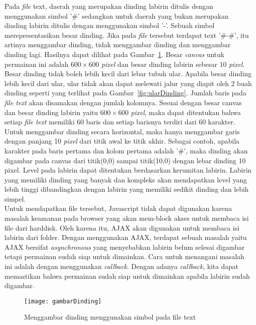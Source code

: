 Pada \textit{file} text, daerah yang merupakan dinding labirin ditulis dengan menggunakan simbol '\#' sedangkan untuk daerah yang bukan merupakan dinding labirin ditulis dengan menggunakan simbol '-'. Sebuah simbol merepresentasikan besar dinding. Jika pada \textit{file} tersebut terdapat text '\#-\#', itu artinya menggambar dinding, tidak menggambar dinding dan menggambar dinding lagi. Hasilnya dapat dilihat pada Gambar~\ref{fig:gambarDinding}. Besar \textit{canvas} untuk permainan ini adalah $600 \times 600$ \textit{pixel} dan besar dinding labirin sebesar 10 \textit{pixel}. Besar dinding tidak boleh lebih kecil dari lebar tubuh ular. Apabila besar dinding lebih kecil dari ular, ular tidak akan dapat melewati jalur yang diapit oleh 2 buah dinding seperti yang terlihat pada Gambar~\ref{fig:ularDinding}. Jumlah baris pada \textit{file text} akan disamakan dengan jumlah kolomnya. Sesuai dengan besar canvas dan besar dinding labirin yaitu $600 \times 600$ \textit{pixel}, maka dapat ditentukan bahwa setiap \textit{file text} memiliki 60 baris dan setiap barisnya terdiri dari 60 karakter. Untuk menggambar dinding secara horizontal, maka hanya menggambar garis dengan panjang 10 \textit{pixel} dari titik awal ke titik akhir. Sebagai contoh, apabila karakter pada baris pertama dan kolom pertama adalah '\#', maka dinding akan digambar pada canvas dari titik(0,0) sampai titik(10,0) dengan lebar dinding 10 pixel. Level pada labirin dapat ditentukan berdasarkan kerumitan labirin. Labirin yang memiliki dinding yang banyak dan kompleks akan mendapatkan level yang lebih tinggi dibandingkan dengan labirin yang memiliki sedikit dinding dan lebih simpel. \\

Untuk mendapatkan file tersebut, Javascript tidak dapat digunakan karena masalah keamanan pada browser yang akan mem-block akses untuk membaca isi file dari harddisk. Oleh karena itu, AJAX akan digunakan untuk membaca isi labirin dari folder. Dengan menggunakan AJAX, terdapat sebuah masalah yaitu AJAX bersifat \textit{asynchronous} yang menyebabkan labirin belum selesai digambar tetapi permainan sudah siap untuk dimainkan. Cara untuk menangani masalah ini adalah dengan menggunakan \textit{callback}. Dengan adanya \textit{callback}, kita dapat memastikan bahwa permainan sudah siap untuk dimainkan apabila labirin sudah digambar.\\ 


\begin{figure}[H]
	\centering  
	\texttt{[image: gambarDinding]}  
	\caption[Menggambar dinding menggunakan simbol pada file text]{Menggambar dinding menggunakan simbol pada file text}
	\label{fig:gambarDinding} 
\end{figure}

